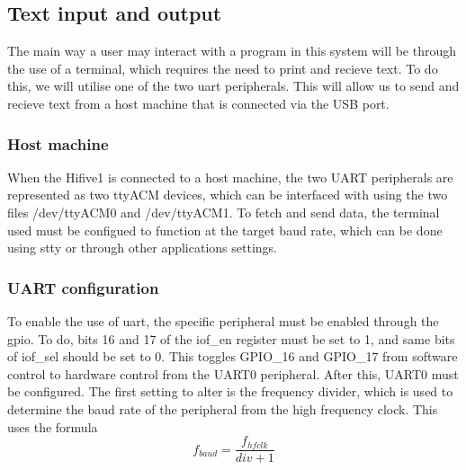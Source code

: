 \subsection{Text input and output}
The main way a user may interact with a program in this system will be through the use of a terminal, which requires the need to print and recieve text. To do this, we will utilise one of the two \ac{uart} peripherals. This will allow us to send and recieve text from a host machine that is connected via the USB port.
\subsubsection{Host machine}
When the Hifive1 is connected to a host machine, the two UART peripherals are represented as two ttyACM devices, which can be interfaced with using the two files /dev/ttyACM0 and /dev/ttyACM1. To fetch and send data, the terminal used must be configued to function at the target baud rate, which can be done using stty or through other applications settings.
\subsubsection{UART configuration}
To enable the use of \ac{uart}, the specific peripheral must be enabled through the \ac{gpio}. To do, bits 16 and 17 of the iof\_en register must be set to 1, and same bits of iof\_sel should be set to 0. This toggles GPIO\_16 and GPIO\_17 from software control to hardware control from the UART0 peripheral. After this, UART0 must be configured. The first setting to alter is the frequency divider, which is used to determine the baud rate of the peripheral from the high frequency clock. This uses the formula \[f_{baud}=\frac{f_{hfclk}}{div+1}\]
